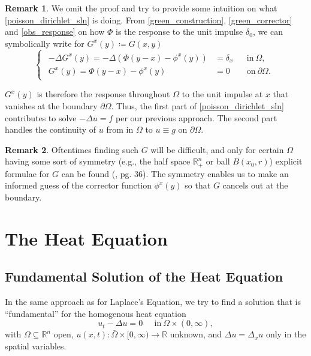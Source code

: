 \documentclass[openany, amssymb, psamsfonts]{amsart}
\theoremstyle{definition}
\newtheorem{rem}{Remark}[section]
\numberwithin{equation}{section}
\newcommand{\bbr}{\mathbb{R}}
\begin{document}
\begin{rem}
We omit the proof and try to provide some intuition on what \eqref{poisson_dirichlet_sln} is doing. From \eqref{green_construction}, \eqref{green_corrector} and  \autoref{obs_response} on how $\Phi$ is the response to the unit impulse $\delta_0$, we can symbolically write for $G^x(y) \coloneqq G(x, y)$\begin{equation}
    \begin{cases}
        \begin{aligned}
        -\Delta G^x (y)= -\Delta (\Phi(y-x) - \phi^x(y)) &= \delta_x  &&\text{in}\: \Omega , \\
        G^x (y)= \Phi(y-x) - \phi^x(y) &= 0  &&\text{on}\: \partial \Omega .
        \end{aligned}
    \end{cases}
\end{equation}

$G^x(y)$ is therefore the response throughout $\Omega$ to the unit impulse at $x$ that vanishes at the boundary $\partial \Omega$. Thus, the first part of \eqref{poisson_dirichlet_sln} contributes to solve $-\Delta u = f$ per our previous approach. The second part handles the continuity of $u$ from in $\Omega$ to $u \equiv g$ on $\partial \Omega$.
\end{rem}
\begin{rem}
Oftentimes finding such $G$ will be difficult, and only for certain $\Omega$ having some sort of symmetry (e.g., the half space $\bbr^n_+$ or ball $B(x_0, r)$) explicit formulae for $G$ can be found (\cite{Evans}, pg. 36). The symmetry enables us to make an informed guess of the corrector function $\phi^x(y)$ so that $G$ cancels out at the boundary.
\end{rem}

\section{The Heat Equation}
\subsection{Fundamental Solution of the Heat Equation}
In the same approach as for Laplace's Equation, we try to find a solution that is ``fundamental'' for the homogenous heat equation
\begin{equation} \label{heat}
    u_t - \Delta u = 0 \;\;\;\;\; \text{in}\: \Omega \times (0, \infty) ,
\end{equation}
with $\Omega \subseteq \bbr^n$ open, $u(x, t): \bar{\Omega} \times [0, \infty) \to \bbr$ unknown, and $\Delta u = \Delta_x u$ only in the spatial variables.
\end{document}
